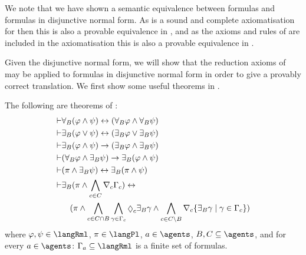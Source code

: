 We note that we have shown a semantic equivalence between \langMl{} formulas and formulas in disjunctive normal form.
As \axiomK{} is a sound and complete axiomatisation for \logicK{} then this is also a provable equivalence in \axiomK{}, and as the axioms and rules of \axiomK{} are included in the axiomatisation \axiomRmlK{} this is also a provable equivalence in \axiomRmlK{}.

Given the disjunctive normal form, we will show that the reduction axioms of \axiomRmlK{} may be applied to formulas in disjunctive normal form in order to give a provably correct translation.
We first show some useful theorems in \axiomRmlK{}.

\begin{lemma}\label{rml-k-theorems}
The following are theorems of \axiomRmlK{}:
\begin{align}
    \proves & \allrefsBs (\phi \land \psi) \iff (\allrefsBs \phi \land \allrefsBs \psi) \label{rml-k-and}\\
    \proves & \somerefsBs (\phi \lor \psi) \iff (\somerefsBs \phi \lor \somerefsBs \psi) \label{rml-k-or}\\
    \proves & \somerefsBs (\phi \land \psi) \implies (\somerefsBs \phi \land \somerefsBs \psi) \label{rml-k-d-and}\\
    \proves & (\allrefsBs \phi \land \somerefsBs \psi) \implies \somerefsBs (\phi \land \psi) \label{rml-k-db-and}\\
    \proves & (\pi \land \somerefsBs \psi) \iff \somerefsBs (\pi \land \psi) \label{rml-k-pd-and}\\
    \proves & \displaystyle \somerefsBs (\pi \land \bigwedge_{\agentC \in \agentsC} \coverC \Gamma_\agentC) \iff \nonumber\\
            & \displaystyle \quad
            (
            \pi \land
            \bigwedge_{\agentC \in \agentsC \cap \agentsB} \bigwedge_{\gamma \in \Gamma_\agentC} \possibleC \somerefsBs \gamma \land
            \bigwedge_{\agentC \in \agentsC \setminus \agentsB} \coversC \{\somerefsBs \gamma \mid \gamma \in \Gamma_\agentC\} 
            ) \label{rml-k-cover}
\end{align}
where $\phi, \psi \in \langRml$, $\pi \in \langPl$, $\agentA \in \agents$, $\agentsB, \agentsC \subseteq \agents$, and for every $\agentA \in \agents$: $\Gamma_\agentA \subseteq \langRml$ is a finite set of formulas.
\end{lemma}

